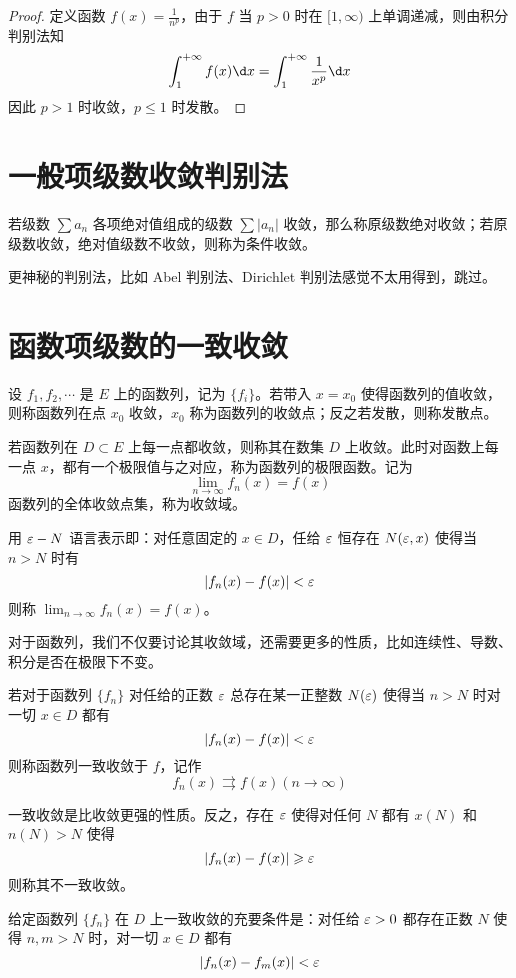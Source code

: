 \begin{proof}
	定义函数 $f(x) = \frac{1}{n^p}$，由于 $f$ 当 $p > 0$ 时在 $[1, \infty)$ 上单调递减，则由积分判别法知
	\[ \int_{1}^{+\infty} f(x) \d x = \int_{1}^{+\infty} \frac{1}{x^p} \d x \]
	因此 $p > 1$ 时收敛，$p \leqslant 1$ 时发散。
\end{proof}

\section{一般项级数收敛判别法}

若级数 $\sum a_n$ 各项绝对值组成的级数 $\sum |a_n|$ 收敛，那么称原级数绝对收敛；若原级数收敛，绝对值级数不收敛，则称为条件收敛。

更神秘的判别法，比如 Abel 判别法、Dirichlet 判别法感觉不太用得到，跳过。


\section{函数项级数的一致收敛}

设 $f_1, f_2, \cdots$ 是 $E$ 上的函数列，记为 $\{f_i\}$。若带入 $x = x_0$ 使得函数列的值收敛，则称函数列在点 $x_0$ 收敛，$x_0$ 称为函数列的收敛点；反之若发散，则称发散点。

若函数列在 $D \subset E$ 上每一点都收敛，则称其在数集 $D$ 上收敛。此时对函数上每一点 $x$，都有一个极限值与之对应，称为函数列的极限函数。记为
\[ \lim_{n \to \infty} f_n(x) = f(x) \]
函数列的全体收敛点集，称为收敛域。

用 $\varepsilon - N$ 语言表示即：对任意固定的 $x \in D$，任给 $\varepsilon$ 恒存在 $N(\varepsilon, x)$ 使得当 $n > N$ 时有
\[ | f_n(x) - f(x) | < \varepsilon \]
则称 $\lim_{n \to \infty} f_n(x) = f(x)$。

对于函数列，我们不仅要讨论其收敛域，还需要更多的性质，比如连续性、导数、积分是否在极限下不变。

\begin{definition}
	若对于函数列 $\{f_n\}$ 对任给的正数 $\varepsilon$ 总存在某一正整数 $N(\varepsilon)$ 使得当 $n > N$ 时对一切 $x \in D$ 都有
	\[ |f_n(x) - f(x)| < \varepsilon \]
	则称函数列一致收敛于 $f$，记作
	\[ f_n(x) \rightrightarrows f(x) (n \to \infty) \]
\end{definition}

一致收敛是比收敛更强的性质。反之，存在 $\varepsilon$ 使得对任何 $N$ 都有 $x(N)$ 和 $n(N) > N$ 使得
\[ |f_n(x) - f(x) | \geqslant \varepsilon \]
则称其不一致收敛。

\begin{theorem}
	给定函数列 $\{f_n\}$ 在 $D$ 上一致收敛的充要条件是：对任给 $\varepsilon > 0$ 都存在正数 $N$ 使得 $n, m > N$ 时，对一切 $x \in D$ 都有
	\[ |f_n(x) - f_m(x) | < \varepsilon \]
\end{theorem}

